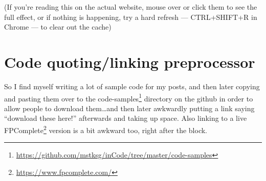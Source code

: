 \documentclass[]{article}
\newenvironment{Shaded}{}{}
\newcommand{\CommentTok}[1]{\textcolor[rgb]{0.38,0.63,0.69}{\textit{#1}}}
\newcommand{\DataTypeTok}[1]{\textcolor[rgb]{0.56,0.13,0.00}{#1}}
\newcommand{\FunctionTok}[1]{\textcolor[rgb]{0.02,0.16,0.49}{#1}}
\newcommand{\KeywordTok}[1]{\textcolor[rgb]{0.00,0.44,0.13}{\textbf{#1}}}
\newcommand{\NormalTok}[1]{#1}
\newcommand{\OtherTok}[1]{\textcolor[rgb]{0.00,0.44,0.13}{#1}}
\renewcommand{\href}[2]{#2\footnote{\url{#1}}}
\begin{document}
\begin{Shaded}
\end{Shaded}

(If you're reading this on the actual website, mouse over or click them to see
the full effect, or if nothing is happening, try a hard refresh --- CTRL+SHIFT+R
in Chrome --- to clear out the cache)

\hypertarget{code-quotinglinking-preprocessor}{%
\section{Code quoting/linking
preprocessor}\label{code-quotinglinking-preprocessor}}

So I find myself writing a lot of sample code for my posts, and then later
copying and pasting them over to the
\href{https://github.com/mstksg/inCode/tree/master/code-samples}{code-samples}
directory on the github in order to allow people to download them\ldots{}and
then later awkwardly putting a link saying ``download these here!'' afterwards
and taking up space. Also linking to a live
\href{https://www.fpcomplete.com/}{FPComplete} version is a bit awkward too,
right after the block.
\end{document}

